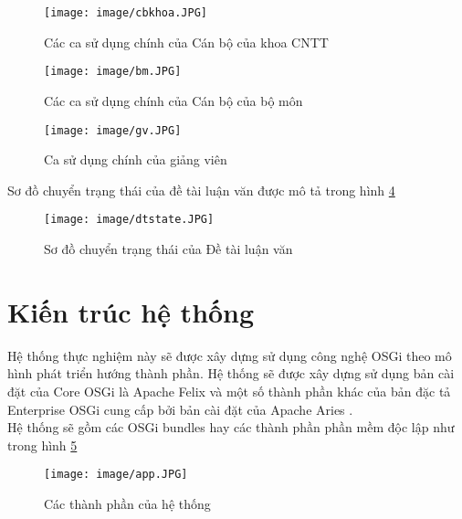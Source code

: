 \begin{figure}[htbp]
	\centering
		\texttt{[image: image/cbkhoa.JPG]}
	\caption{Các ca sử dụng chính của Cán bộ của khoa CNTT}
	\label{fig:cbkhoa}
\end{figure}

\begin{figure}[htbp]
	\centering
		\texttt{[image: image/bm.JPG]}
	\caption{Các ca sử dụng chính của Cán bộ của bộ môn}
	\label{fig:bm}
\end{figure}
 
\begin{figure}[htbp]
	\centering
		\texttt{[image: image/gv.JPG]}
	\caption{Ca sử dụng chính của giảng viên}
	\label{fig:gv}
\end{figure}

Sơ đồ chuyển trạng thái của đề tài luận văn được mô tả trong hình \ref{fig:dtstate}
\begin{figure}[htbp]
	\centering
		\texttt{[image: image/dtstate.JPG]}
	\caption{Sơ đồ chuyển trạng thái của Đề tài luận văn}
	\label{fig:dtstate}
\end{figure}


\section{Kiến trúc hệ thống}
Hệ thống thực nghiệm này sẽ được xây dựng sử dụng công nghệ OSGi theo mô hình phát triển hướng thành phần. Hệ thống sẽ được xây dựng sử dụng bản cài đặt của Core OSGi là Apache Felix \cite{felix} và một số thành phần khác của bản đặc tả Enterprise OSGi cung cấp bởi bản cài đặt của Apache Aries \cite{aries}. \\

Hệ thống sẽ gồm các OSGi bundles hay các thành phần phần mềm độc lập như trong hình \ref{fig:app}
\begin{figure}[htbp]
	\centering
		\texttt{[image: image/app.JPG]}
	\caption{Các thành phần của hệ thống}
	\label{fig:app}
\end{figure}


